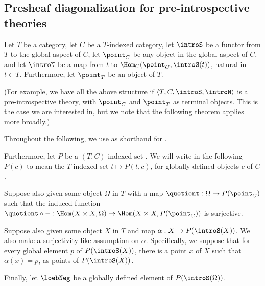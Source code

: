 \subsection{Presheaf diagonalization for pre-introspective theories}\label{PreIntrospDiagSection}
\label{PreIntrospDiag}
Let $T$ be a category, let $C$ be a $T$-indexed category, let $\introS$ be a functor from $T$ to the global aspect of $C$, let $\point_C$ be any object in the global aspect of $C$, and let $\introN$ be a map from $t$ to $\Hom_C(\point_C, \introS(t))$, natural in $t \in T$. Furthermore, let $\point_T$ be an object of $T$.

(For example, we have all the above structure if $\langle T, C, \introS, \introN \rangle$ is a pre-introspective theory, with $\point_C$ and $\point_T$ as terminal objects. This is the case we are interested in, but we note that the following theorem applies more broadly.)

Throughout the following, we use  as shorthand for .

Furthermore, let $P$ be a $(T, C)$-indexed set . We will write in the following $P(c)$ to mean the $T$-indexed set $t \mapsto P(t, c)$, for globally defined objects $c$ of $C$.

Suppose also given some object $\Omega$ in $T$ with a map $\quotient : \Omega \to P(\point_C)$ such that the induced function $\quotient \circ - : \Hom(X \times X, \Omega) \to \Hom(X \times X, P(\point_C))$ is surjective.

Suppose also given some object $X$ in $T$ and map $\alpha : X \to P(\introS(X))$. We also make a surjectivity-like assumption on $\alpha$. Specifically, we suppose that for every global element $p$ of $P(\introS(X))$, there is a point $x$ of $X$ such that $\alpha(x) = p$, as points of $P(\introS(X))$.

Finally, let $\loebNeg$ be a globally defined element of $P(\introS(\Omega))$.

